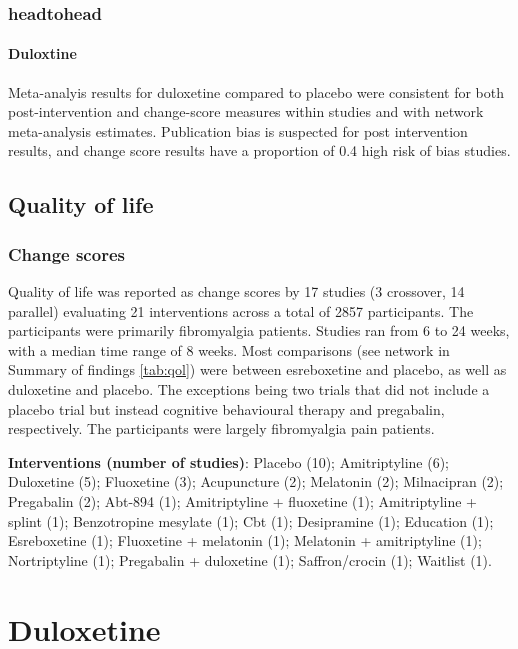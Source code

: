 \documentclass{report}\usepackage[]{graphicx}\usepackage[]{color}
\begin{document}
\subsection{headtohead}

\subsubsection{Duloxtine}

Meta-analyis results for duloxetine compared to placebo were consistent for both post-intervention and change-score measures within studies and with network meta-analysis estimates. Publication bias is suspected for post intervention results, and change score results have a proportion of 0.4 high risk of bias studies.


\section{Quality of life}

\subsection{Change scores}

Quality of life was reported as change scores by 17 studies (3 crossover, 14 parallel) evaluating 21 interventions across a total of 2857 participants. The participants were primarily fibromyalgia patients. Studies ran from 6 to 24 weeks, with a median time range of 8 weeks. Most comparisons (see network in Summary of findings \ref{tab:qol}) were between esreboxetine and placebo, as well as duloxetine and placebo. The exceptions being two trials that did not include a placebo trial but instead cognitive behavioural therapy and pregabalin, respectively. The participants were largely fibromyalgia pain patients.


\textbf{Interventions (number of studies)}: Placebo (10); Amitriptyline (6); Duloxetine (5); Fluoxetine (3); Acupuncture (2); Melatonin (2); Milnacipran (2); Pregabalin (2); Abt-894 (1); Amitriptyline + fluoxetine (1); Amitriptyline + splint (1); Benzotropine mesylate (1); Cbt (1); Desipramine (1); Education (1); Esreboxetine (1); Fluoxetine + melatonin (1); Melatonin + amitriptyline (1); Nortriptyline (1); Pregabalin + duloxetine (1); Saffron/crocin (1); Waitlist (1).

\chapter{Duloxetine}
\end{document}
